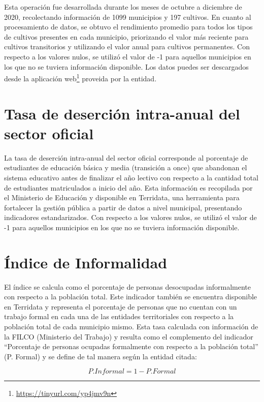 Esta operación fue desarrollada durante los meses de octubre a diciembre de 2020, recolectando información de 1099 municipios y 197 cultivos. En cuanto al 
procesamiento de datos, se obtuvo el rendimiento promedio para todos los tipos de cultivos presentes en cada municipio, priorizando el valor más reciente para 
cultivos transitorios y utilizando el valor anual para cultivos permanentes. Con respecto a los valores nulos, se utilizó el valor de -1 para aquellos 
municipios en los que no se tuviera información disponible.  Los datos puedes ser descargados desde la aplicación 
web\footnote{\url{https://tinyurl.com/yp4jmv9n}} proveida por la entidad.
 
\section{Tasa de deserción intra-anual del sector oficial}

La tasa de deserción intra-anual del sector oficial corresponde al porcentaje de estudiantes de educación básica y media (transición a once) que abandonan el 
sistema educativo antes de finalizar el año lectivo con respecto a la cantidad total de estudiantes matriculados a inicio del año. Esta información es 
recopilada por el Ministerio de Educación y disponible en Terridata, una herramienta para fortalecer la gestión pública a partir de datos a nivel municipal, 
presentando indicadores estandarizados. Con respecto a los valores nulos, se utilizó el valor de -1 para aquellos municipios en los que no se tuviera 
información disponible.

\section{Índice de Informalidad}

El índice se calcula como el porcentaje de personas desocupadas informalmente con respecto a la población total.  Este indicador también se encuentra 
disponible en Terridata y representa el porcentaje de personas que no cuentan con un trabajo formal en cada una de las entidades territoriales con respecto a 
la población total de cada municipio mismo. Esta tasa calculada con información de la FILCO (Ministerio del Trabajo) y resulta como el complemento del 
indicador ``Porcentaje de personas ocupadas formalmente con respecto a la población total'' (P. Formal) y se define de tal manera según la entidad citada: 

$$P. Informal = 1 - P. Formal$$

